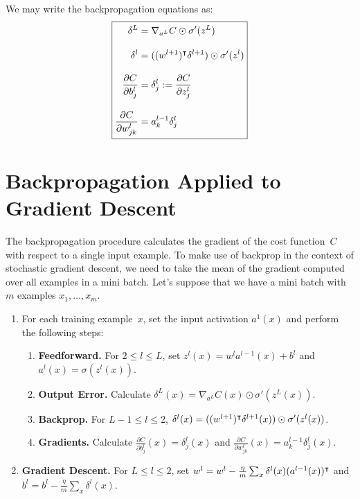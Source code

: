 We may write the backpropagation equations as:
\begin{equation}
\boxed{
\setlength{\jot}{12pt}
\begin{aligned}
    \delta^{L} & = \nabla_{a^L} C \odot \sigma'(z^L) \\
    \delta^{l} & = ( \trans{(w^{l + 1})} \delta^{l + 1} ) \odot \sigma'(z^l) \\
    \frac{\partial C}{\partial b_j^{l}} & = \delta_{j}^l := \frac{\partial C}{\partial z_j^l}\\
    \frac{\partial C}{\partial w_{j k}^l} & = a_{k}^{l - 1} \delta_{j}^l
\end{aligned}
}
\end{equation}
\section{Backpropagation Applied to Gradient Descent}

The backpropagation procedure calculates the gradient of the cost
function~$C$ with respect to a single input example. To make use of
backprop in the context of stochastic gradient descent, we need to take
the mean of the gradient computed over all examples in a mini batch.
Let's suppose that we have a mini batch with $m$ examples
$x_1, \ldots, x_m$.
\begin{enumerate}
    \item For each training example~$x$, set the input activation
        $a^1 (x)$ and perform the following steps:
        \begin{enumerate}
            \item \textbf{Feedforward.} For $2 \leq l \leq L$, set
                $z^l (x) = w^l a^{l - 1} (x) + b^l$ and
                $a^l (x) = \sigma (z^l (x))$.
            \item \textbf{Output Error.} Calculate
                $\delta^L (x) = \nabla_{a^L} C(x) \odot \sigma' (z^L (x) )$.
            \item \textbf{Backprop.} For $L - 1 \leq l \leq 2$,
                $\delta^l (x) = ( (w^{l + 1})^{\intercal} \delta^{l + 1} (x) )
                                    \odot \sigma' (z^l (x))$.
            \item \textbf{Gradients.} Calculate
            $ \frac{\partial C}{\partial b_j^{l}} (x) = \delta_{j}^l (x)$
            and $\frac{\partial C}{\partial w_{j k}^l} (x)
                    = a_{k}^{l - 1} \delta_{j}^l (x)$.
        \end{enumerate}
    \item \textbf{Gradient Descent.} For $L \leq l \leq 2$, set
        $w^l = w^l - \frac{\eta}{m} \sum_{x} \delta^{l} (x) (a^{l - 1} (x))^{\intercal}$
        and
        $b^l = b^l - \frac{\eta}{m} \sum_{x} \delta^l (x)$.
\end{enumerate}
